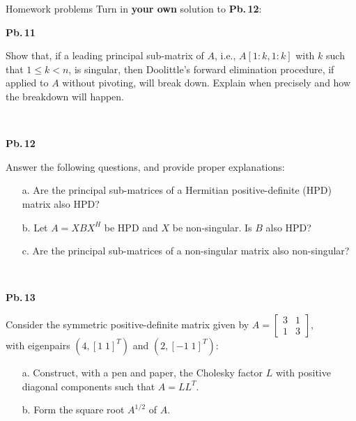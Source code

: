 \documentclass[t,usepdftitle=false]{beamer}
\begin{document}
\begin{frame}{Homework problems}
Turn in \textbf{your own} solution to \textbf{Pb.$\,$12}:\vspace{.08cm}\\
\begin{minipage}[t]{0.1\textwidth}
\textbf{Pb.$\,$11}
\end{minipage}
\begin{minipage}[t]{0.89\textwidth}
Show that, if a leading principal sub-matrix of $A$, i.e., $A[1\!:\!k,1\!:\!k]$ with $k$ such that $1\leq k<n$, is singular, then Doolittle's forward elimination procedure, if applied to $A$ without pivoting, will break down.
Explain when precisely and how the breakdown will happen.
\end{minipage}\vspace{.08cm}\\
\begin{minipage}[t]{0.1\textwidth}
\textbf{Pb.$\,$12}
\end{minipage}
\begin{minipage}[t]{0.89\textwidth}
Answer the following questions, and provide proper explanations:\vspace{-.08cm}
\begin{enumerate}
\item[a.] Are the principal sub-matrices of a Hermitian positive-definite (HPD) matrix also HPD?\vspace{-.08cm}
\item[b.] Let $A=XBX^H$ be HPD and $X$ be non-singular. Is $B$ also HPD?\vspace{-.08cm}
\item[c.] Are the principal sub-matrices of a non-singular matrix also non-singular?
\end{enumerate}
\end{minipage}\vspace{-.12cm}\\
\begin{minipage}[t]{0.1\textwidth}
\textbf{Pb.$\,$13}
\end{minipage}
\begin{minipage}[t]{0.89\textwidth}
Consider the symmetric positive-definite matrix given by $\displaystyle A=\begin{bmatrix}3&1\\1&3\end{bmatrix}$,\vspace{-.15cm}\\
with eigenpairs $\left(4,[1\;1]^T\right)$ and $\left(2, [-1\;1]^T\right)$:
\begin{enumerate}\normalsize
\item[a.] Construct, with a pen and paper, the Cholesky factor $L$ with positive diagonal components such that $A=LL^T$.\vspace{-.08cm}
\item[b.] Form the square root $A^{1/2}$ of $A$.
\end{enumerate}
\end{minipage}
\end{frame}
\end{document}
